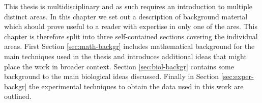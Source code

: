 
This thesis is multidisciplinary and as such requires an introduction to multiple distinct areas. In this chapter we set out a description of background material which should prove useful to a reader with expertise in only one of the ares. This chapter is therefore split into three self-contained sections covering the individual areas. First Section \ref{sec:math-backgr} includes mathematical background for the main techniques used in the thesis and introduces additional ideas that might place the work in broader context. Section \ref{sec:biol-backgr} contains some background to the main biological ideas discussed. Finally in Section \ref{sec:exper-backgr} the experimental techniques to obtain the data used in this work are outlined.


